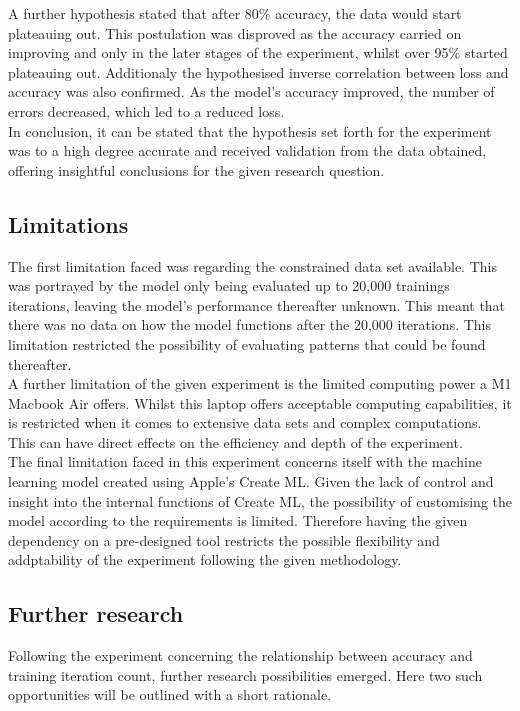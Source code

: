 A further hypothesis stated that after 80\% accuracy, the data would start plateauing out. This postulation was disproved as the accuracy carried on improving and only in the later stages of the experiment, whilst over 95\% started plateauing out.  Additionaly the hypothesised inverse correlation between loss and accuracy was also confirmed. As the model's accuracy improved, the number of errors decreased, which led to a reduced loss.\\ 

In conclusion, it can be stated that the hypothesis set forth for the experiment was to a high degree accurate and received validation from the data obtained, offering insightful conclusions for the given research question. 	\\	

\subsection{Limitations}
The first limitation faced was regarding the constrained data set available. This was portrayed by the model only being evaluated up to 20,000 trainings iterations, leaving the model's performance thereafter unknown. This meant that there was no data on how the model functions after the 20,000 iterations. This limitation restricted the possibility of evaluating patterns that could be found thereafter.\\ 

A further limitation of the given experiment is the limited computing power a M1 Macbook Air offers. Whilst this laptop offers acceptable computing capabilities, it is restricted when it comes to extensive data sets and complex computations. This can have direct effects on the efficiency and depth of the experiment.\\

The final limitation faced in this experiment concerns itself with the machine learning model created using Apple's Create ML. Given the lack of control and insight into the internal functions of Create ML, the possibility of customising the model according to the requirements is limited. Therefore having the given dependency on a pre-designed tool restricts the possible flexibility and addptability of the experiment following the given methodology. \\

\subsection{Further research}
Following the experiment concerning the relationship between accuracy and training iteration count, further research possibilities emerged. Here two such opportunities will be outlined with a short rationale. \\

